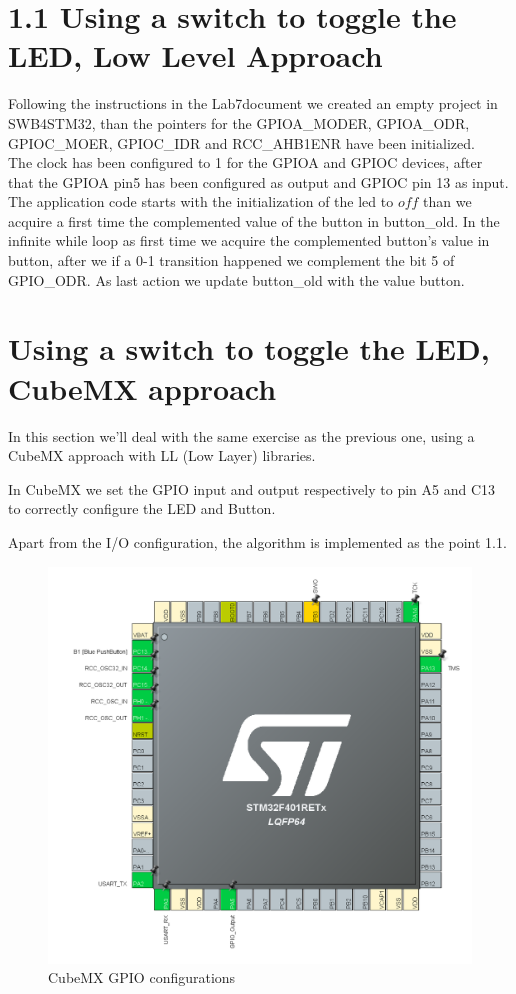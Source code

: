 \documentclass[12pt]{article}
\begin{document}
\section{1.1 Using a switch to toggle the LED, Low Level Approach}
Following the instructions in the Lab7document we created an empty project in SWB4STM32, than the pointers for the GPIOA\_MODER, GPIOA\_ODR, GPIOC\_MOER, GPIOC\_IDR and RCC\_AHB1ENR have been initialized. \\
The clock has been configured to 1 for the GPIOA and GPIOC devices, after that the GPIOA pin5 has been configured as output and GPIOC pin 13 as input.\\
The application code starts with the initialization of the led to $off$ than we acquire a first time the complemented value of the button in button\_old. In the infinite while loop as first time we acquire the complemented button's value in button, after we if a 0-1 transition happened we complement the bit 5 of GPIO\_ODR. As last action we update button\_old with the value button.


\section{Using a switch to toggle the LED, CubeMX approach}
In this section we'll deal with the same exercise as the previous one, using a CubeMX approach with LL (Low Layer) libraries. 

In CubeMX we set the GPIO input and output respectively to pin A5 and C13 to correctly configure the LED and Button.

Apart from the I/O configuration, the algorithm is implemented as the point 1.1.

	\begin{figure}[!h]
		\centering
		\includegraphics[scale = 0.7]{immagini/1_2.png}
		\caption{CubeMX GPIO configurations}
	\end{figure}
\end{document}
